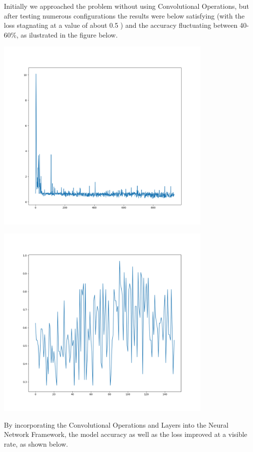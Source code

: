 Initially we approached the problem without using Convolutional Operations, but after testing numerous configurations
the results were below satisfying (with the loss stagnating at a value of about 0.5 ) and the accuracy fluctuating between 40-60\%, as ilustrated in the figure below.


\begin{center}
	\centering
	\includegraphics[width = 4.2in]{images/badmetricspng.png}
	\centerline{}
\label{bad_metrics}
\end{center}


\begin{center}
	\centering
	\includegraphics[width = 4.2in]{images/badacc.png}
	\centerline{}
\label{bad_metrics2}
\end{center}
By incorporating the Convolutional Operations and Layers into the Neural Network Framework, the model accuracy as well
as the loss improved at a visible rate, as shown below.


